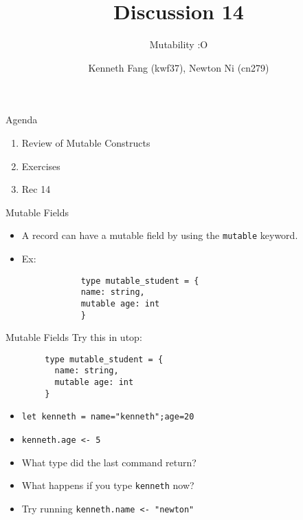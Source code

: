 \documentclass{beamer}
\title{Discussion 14}
\subtitle{Mutability :O}
\author{Kenneth Fang (kwf37), Newton Ni (cn279)}
\begin{document}
    \begin{frame}
        \titlepage{}
    \end{frame}

    \begin{frame}{Agenda}
        \begin{enumerate}
            \item Review of Mutable Constructs
            \item Exercises
            \item Rec 14
        \end{enumerate}
    \end{frame}

    \begin{frame}[fragile=singleslide]{Mutable Fields}
        \begin{itemize}
            \item A record can have a mutable field by using the \texttt{mutable} keyword.
            \item Ex:
            \begin{verbatim}
            type mutable_student = {
            name: string,
            mutable age: int
            }
            \end{verbatim}
        \end{itemize}
    \end{frame}

    \begin{frame}[fragile=singleslide]{Mutable Fields}
        Try this in utop:
        \begin{verbatim}
        type mutable_student = {
          name: string,
          mutable age: int
        }
        \end{verbatim}
        \begin{itemize}
            \item \texttt{let kenneth = {name="kenneth";age=20}}
            \item \texttt{kenneth.age <- 5}
            \item What type did the last command return?
            \item What happens if you type \texttt{kenneth} now?
            \item Try running \texttt{kenneth.name <- "newton"}
        \end{itemize}
    \end{frame}
\end{document}
